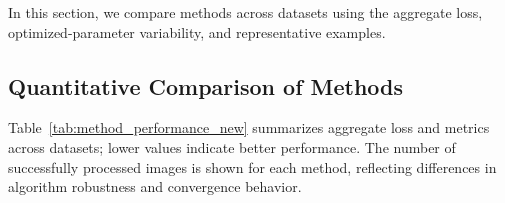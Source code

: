 \documentclass[iucr]{iucrjournals}
\begin{document}



In this section, we compare methods across datasets using the aggregate loss, optimized-parameter variability, and representative examples.

\subsection{Quantitative Comparison of Methods}


Table~\ref{tab:method_performance_new} summarizes aggregate loss and metrics across datasets; lower values indicate better performance. The number of successfully processed images is shown for each method, reflecting differences in algorithm robustness and convergence behavior.

\end{document}
